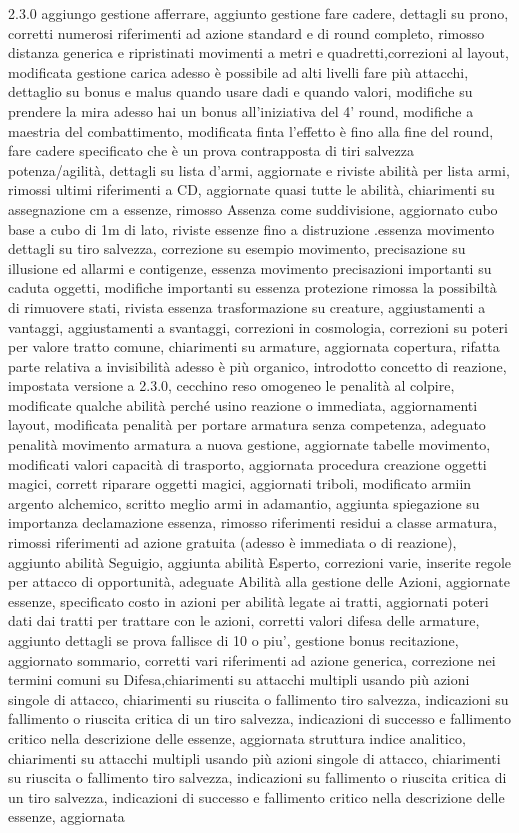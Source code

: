 \documentclass[a4paper,11pt,twoside,openany]{book}
\begin{document}
{{2.3.0 aggiungo gestione afferrare, aggiunto gestione fare cadere, dettagli su prono, corretti numerosi riferimenti ad azione standard e di round completo, rimosso distanza generica e ripristinati movimenti a metri e quadretti,correzioni al layout, modificata gestione carica adesso è possibile ad alti livelli fare più attacchi, dettaglio su bonus e malus quando usare dadi e quando valori, modifiche su prendere la mira adesso hai un bonus all'iniziativa del 4' round, modifiche a maestria del combattimento, modificata finta l'effetto è fino alla fine del round, fare cadere specificato che è un prova contrapposta di tiri salvezza potenza/agilità, dettagli su lista d'armi, aggiornate e riviste abilità per lista armi, rimossi ultimi riferimenti a CD, aggiornate quasi tutte le abilità, chiarimenti su assegnazione cm a essenze, rimosso Assenza come suddivisione, aggiornato cubo base a cubo di 1m di lato, riviste essenze fino a distruzione .essenza movimento dettagli su tiro salvezza, correzione su esempio movimento, precisazione su illusione ed allarmi e contigenze, essenza movimento precisazioni importanti su caduta oggetti, modifiche importanti su essenza protezione rimossa la possibiltà di rimuovere stati, rivista essenza trasformazione su creature, aggiustamenti a vantaggi, aggiustamenti a svantaggi, correzioni in cosmologia, correzioni su poteri per valore tratto comune, chiarimenti su armature, aggiornata copertura, rifatta parte relativa a invisibilità adesso è più organico, introdotto concetto di reazione, impostata versione a 2.3.0, cecchino reso omogeneo le penalità al colpire, modificate qualche abilità perché usino reazione o immediata, aggiornamenti layout, modificata penalità per portare armatura senza competenza, adeguato penalità movimento armatura a nuova gestione, aggiornate tabelle movimento, modificati valori capacità di trasporto, aggiornata procedura creazione oggetti magici, corrett riparare oggetti magici, aggiornati triboli, modificato armiin argento alchemico, scritto meglio armi in adamantio, aggiunta spiegazione su importanza declamazione essenza, rimosso riferimenti residui a classe armatura, rimossi riferimenti ad azione gratuita (adesso è immediata o di reazione), aggiunto abilità Seguigio, aggiunta abilità Esperto, correzioni varie, inserite regole per attacco di opportunità, adeguate Abilità alla gestione delle Azioni, aggiornate essenze, specificato costo in azioni per abilità legate ai tratti, aggiornati poteri dati dai tratti per trattare con le azioni, corretti valori difesa delle armature, aggiunto dettagli se prova fallisce di 10 o piu', gestione bonus recitazione, aggiornato sommario, corretti vari riferimenti ad azione generica, correzione nei termini comuni su Difesa,chiarimenti su attacchi multipli usando più azioni singole di attacco, chiarimenti su riuscita o fallimento tiro salvezza, indicazioni su fallimento o riuscita critica di un tiro salvezza, indicazioni di successo e fallimento critico nella descrizione delle essenze, aggiornata struttura indice analitico, chiarimenti su attacchi multipli usando più azioni singole di attacco, chiarimenti su riuscita o fallimento tiro salvezza, indicazioni su fallimento o riuscita critica di un tiro salvezza, indicazioni di successo e fallimento critico nella descrizione delle essenze, aggiornata }}
\end{document}
